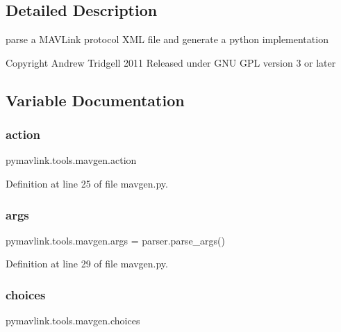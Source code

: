 \subsection{Detailed Description}
\begin{DoxyVerb}parse a MAVLink protocol XML file and generate a python implementation

Copyright Andrew Tridgell 2011
Released under GNU GPL version 3 or later\end{DoxyVerb}
 

\subsection{Variable Documentation}
\mbox{\label{namespacepymavlink_1_1tools_1_1mavgen_ad1a13c732d7b5b8ed0b947b8676ab432}} 
\subsubsection{\texorpdfstring{action}{action}}
{\footnotesize\ttfamily pymavlink.\+tools.\+mavgen.\+action}



Definition at line 25 of file mavgen.\+py.

\mbox{\label{namespacepymavlink_1_1tools_1_1mavgen_a888343496d6a4a5f4101ab9385211105}} 
\subsubsection{\texorpdfstring{args}{args}}
{\footnotesize\ttfamily pymavlink.\+tools.\+mavgen.\+args = parser.\+parse\+\_\+args()}



Definition at line 29 of file mavgen.\+py.

\mbox{\label{namespacepymavlink_1_1tools_1_1mavgen_a4b803f2f45afaf55c54a2a6ce4d207e4}} 
\subsubsection{\texorpdfstring{choices}{choices}}
{\footnotesize\ttfamily pymavlink.\+tools.\+mavgen.\+choices}



